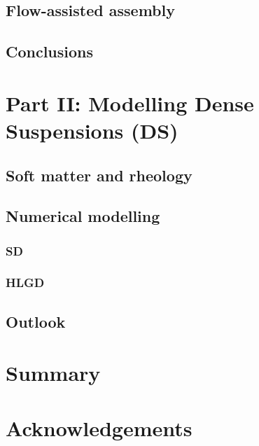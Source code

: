 \hypertarget{assembly}{%
  \subsection{Flow-assisted assembly}}

\hypertarget{conclusion1}{%
  \subsection{Conclusions}}

\hypertarget{part2}{%
  \section{Part II: Modelling Dense Suspensions (DS)}}

\hypertarget{background2}{%
  \subsection{Soft matter and rheology}}

\hypertarget{simulation2}{%
  \subsection{Numerical modelling}}

\hypertarget{sd}{%
  \subsubsection{SD}}

\hypertarget{hlgd}{%
  \subsubsection{HLGD}}

\hypertarget{conclusion2}{%
  \subsection{Outlook}}

\hypertarget{summary}{%
  \section{Summary}}

\hypertarget{acknowledgements}{%
  \section{Acknowledgements}}










